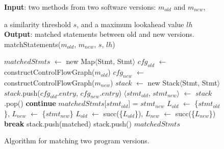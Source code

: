 \begin{figure}[t]
\textbf{Input}: two methods from two software versions: $\mathit{m_{old}}$ and $m_{new}$,

\quad a similarity threshold $\mathit{s}$, and a maximum lookahead value $\mathit{lh}$\\
\textbf{Output}: matched statements between old and new versions.
\vspace{-4mm}%
matchStatements($\mathit{m_{old}}$, $\mathit{m_{new}}$, $\mathit{s}$, $\mathit{lh}$)\\
\begin{algorithmic}[1]
\STATE $\mathit{matchedStmts}$ $\leftarrow$ new Map$\langle$Stmt, Stmt$\rangle$
\STATE $\mathit{cfg_{old}}$ $\leftarrow$ constructControlFlowGraph($\mathit{m_{old}}$)
\STATE $\mathit{cfg_{new}}$ $\leftarrow$ constructControlFlowGraph($\mathit{m_{new}}$)
\STATE $\mathit{stack}$ $\leftarrow$ new Stack$\langle$Stmt, Stmt$\rangle$
\STATE $\mathit{stack}$.push($\mathit{cfg_{old}}$.$\mathit{entry}$, $\mathit{cfg_{new}}$.$\mathit{entry}$)
\STATE $\langle$$\mathit{stmt_{old}}$, $\mathit{stmt_{new}}$$\rangle$ $\leftarrow$ $\mathit{stack}$.pop()
\STATE \textbf{continue}
\ENDIF
{}
\STATE $\mathit{matchedStmts}$[$\mathit{stmt_{old}}$] = $\mathit{stmt_{new}}$
\ELSE
\STATE $L_{old}$ $\leftarrow$ \{$\mathit{stmt_{old}}$\}, $L_{new}$ $\leftarrow$ \{$\mathit{stmt_{new}}$\}
\STATE $L_{old}$ $\leftarrow$ succ(\{$\mathit{L_{old}}$\}), $L_{new}$ $\leftarrow$ succ(\{$\mathit{L_{new}}$\})
\STATE \textbf{break}
\ENDIF
\ENDFOR
\ENDFOR
\ENDFOR
\ENDIF
{}
\STATE stack.push(matched)
\STATE stack.push()
\ENDIF
\ENDWHILE
\RETURN $\mathit{matchedStmts}$
\end{algorithmic}
\label{fig:matching}
\vspace{-4mm}
\caption{Algorithm for matching two program versions.
}
\end{figure}
